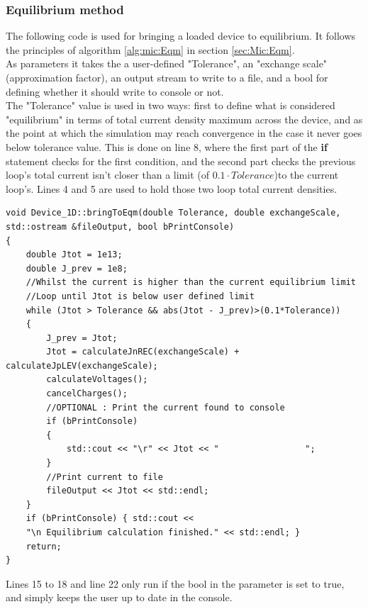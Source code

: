 \documentclass[titlepage]{article}
\begin{document}
\subsubsection{Equilibrium method}
The following code is used for bringing a loaded device to equilibrium. It follows the principles of algorithm \ref{alg:mic:Eqm} in section \ref{sec:Mic:Eqm}. \\
As parameters it takes the a user-defined "Tolerance", an "exchange scale" (approximation factor), an output stream to write to a file, and a bool for defining whether it should write to console or not.\\
The "Tolerance" value is used in two ways: first to define what is considered "equilibrium" in terms of total current density maximum across the device, and as the point at which the simulation may reach convergence in the case it never goes below tolerance value. This is done on line 8, where the first part of the \textbf{if} statement checks for the first condition, and the second part checks the previous loop's total current isn't closer than a limit (of $0.1\cdot Tolerance$)to the current loop's. Lines 4 and 5 are used to hold those two loop total current densities. \\
\begin{lstlisting}
void Device_1D::bringToEqm(double Tolerance, double exchangeScale, 
std::ostream &fileOutput, bool bPrintConsole)
{
	double Jtot = 1e13;
	double J_prev = 1e8;
	//Whilst the current is higher than the current equilibrium limit
	//Loop until Jtot is below user defined limit
	while (Jtot > Tolerance && abs(Jtot - J_prev)>(0.1*Tolerance))
	{
		J_prev = Jtot;	
		Jtot = calculateJnREC(exchangeScale) + calculateJpLEV(exchangeScale);
		calculateVoltages();
		cancelCharges();
		//OPTIONAL : Print the current found to console
		if (bPrintConsole) 
		{	
			std::cout << "\r" << Jtot << "                 ";
		}
		//Print current to file
		fileOutput << Jtot << std::endl;
	}
	if (bPrintConsole) { std::cout << 
	"\n Equilibrium calculation finished." << std::endl; }
	return;
}
\end{lstlisting}
Lines 15 to 18 and line 22 only run if the bool in the parameter is set to true, and simply keeps the user up to date in the console.
\end{document}
